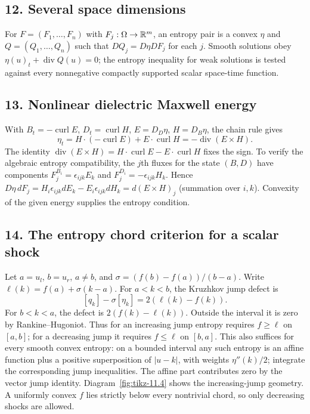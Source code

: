 \subsection*{12. Several space dimensions}
For $F=(F_1,\ldots,F_n)$ with $F_j:\Omega\to\mathbb{R}^m$, an entropy
pair is a convex $\eta$ and $Q=(Q_1,\ldots,Q_n)$ such that
$DQ_j=D\eta DF_j$ for each $j$.
Smooth solutions obey $\eta(u)_t+\operatorname{div}Q(u)=0$;
the entropy inequality for weak solutions is tested against every
nonnegative compactly supported scalar space-time function.

\subsection*{13. Nonlinear dielectric Maxwell energy}
With $B_t=-\operatorname{curl}E$, $D_t=\operatorname{curl}H$,
$E=D_D\eta$, $H=D_B\eta$, the chain rule gives
\[
 \eta_t=H\cdot(-\operatorname{curl}E)+E\cdot\operatorname{curl}H
       =-\operatorname{div}(E\times H).
\]
The identity $\operatorname{div}(E\times H)
=H\cdot\operatorname{curl}E-E\cdot\operatorname{curl}H$
fixes the sign. To verify the algebraic entropy compatibility, the
$j$th fluxes for the state $(B,D)$ have components
$F^{B_i}_j=\epsilon_{ijk}E_k$ and
$F^{D_i}_j=-\epsilon_{ijk}H_k$. Hence
$D\eta\,dF_j=H_i\epsilon_{ijk}dE_k-E_i\epsilon_{ijk}dH_k
=d(E\times H)_j$ (summation over $i,k$).
Convexity of the given energy supplies the entropy condition.

\subsection*{14. The entropy chord criterion for a scalar shock}
Let $a=u_l$, $b=u_r$, $a\ne b$, and
$\sigma=(f(b)-f(a))/(b-a)$. Write
$\ell(k)=f(a)+\sigma(k-a)$.
For $a<k<b$, the Kruzhkov jump defect is
\[
 [q_k]-\sigma[\eta_k]=2(\ell(k)-f(k)).
\]
For $b<k<a$, the defect is $2(f(k)-\ell(k))$.
Outside the interval it is zero by Rankine--Hugoniot.
Thus for an increasing jump entropy requires $f\ge\ell$ on $[a,b]$;
for a decreasing jump it requires $f\le\ell$ on $[b,a]$.
This also suffices for every smooth convex entropy: on a bounded
interval any such entropy is an affine function plus a positive
superposition of $|u-k|$, with weights $\eta''(k)/2$; integrate
the corresponding jump inequalities. The affine part contributes
zero by the vector jump identity. Diagram~\ref{fig:tikz-11.4}
shows the increasing-jump geometry. A uniformly convex $f$ lies
strictly below every nontrivial chord, so only decreasing shocks
are allowed.

